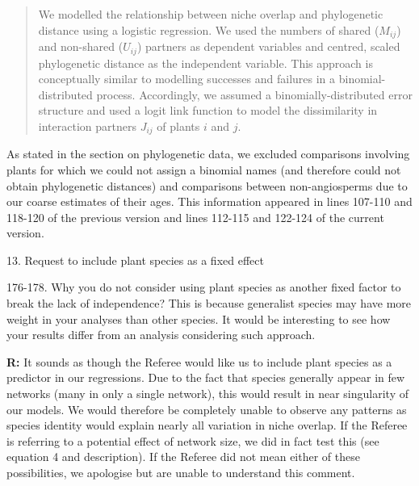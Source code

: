 \documentclass[12pt]{letter}
\newenvironment{refquote}{\bigskip \begin{it}}{\end{it}\smallskip}
\begin{document}
		\smallskip

		\begin{quotation}

			We modelled the relationship between niche overlap and phylogenetic 
			distance using a logistic regression. We used the numbers of shared 
			($M_{ij}$) and non-shared ($U_{ij}$) partners as dependent variables and 
			centred, scaled phylogenetic distance as the independent variable. This 
			approach is conceptually similar to modelling successes and failures in a 
			binomial-distributed process. Accordingly, we assumed a binomially-distributed error structure and used a logit link function to model the dissimilarity in interaction partners 
			$J_{ij}$ of plants $i$ and $j$.

		\end{quotation}


		As stated in the section on phylogenetic data, we excluded comparisons involving plants for which we could not assign a binomial names (and therefore could not obtain phylogenetic distances) and comparisons between non-angiosperms due to our coarse estimates of their ages. This information appeared in lines 107-110 and 118-120 of the previous version and lines 112-115 and 122-124 of the current version.


	13. Request to include plant species as a fixed effect

		\begin{refquote}
			176-178. Why you do not consider using plant species as another fixed factor to break the lack of independence? This is because generalist species may have more weight in your analyses than other species. It would be interesting to see how your results differ from an analysis considering such approach.
		\end{refquote}


		\textbf{R:} It sounds as though the Referee would like us to include plant species as a predictor in our regressions. Due to the fact that species generally appear in few networks (many in only a single network), this would result in near singularity of our models. We would therefore be completely unable to observe any patterns as species identity would explain nearly all variation in niche overlap. If the Referee is referring to a potential effect of network size, we did in fact test this (see equation 4 and description). If the Referee did not mean either of these possibilities, we apologise but are unable to understand this comment.
\end{document}
